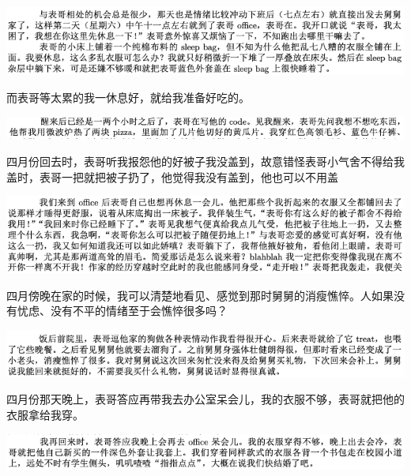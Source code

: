 \documentclass[9pt, b5paper]{article}
\begin{document}
\begin{center}
\includegraphics[width=.9\linewidth]{./pic/p1p52-4.png}
\end{center}

而表哥等太累的我一休息好，就给我准备好吃的。

\begin{center}
\includegraphics[width=.9\linewidth]{./pic/p1p52-1.png}
\end{center}

四月份回去时，表哥听我报怨他的好被子我没盖到，故意错怪表哥小气舍不得给我盖时，表哥一把就把被子扔了，他觉得我没有盖到，他也可以不用盖

\begin{center}
\includegraphics[width=.9\linewidth]{./pic/p1p54-1.png}
\end{center}

四月傍晚在家的时候，我可以清楚地看见、感觉到那时舅舅的消瘦憔悴。人如果没有忧虑、没有不平的情绪至于会憔悴很多吗？

\begin{center}
\includegraphics[width=.9\linewidth]{./pic/p1p54-4.png}
\end{center}

四月份那天晚上，表哥答应再带我去办公室呆会儿，我的衣服不够，表哥就把他的衣服拿给我穿。

\begin{center}
\includegraphics[width=.9\linewidth]{./pic/p1p54-5.png}
\end{center}
\end{document}
